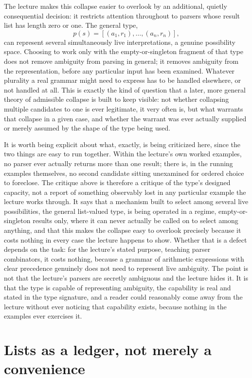 \documentclass[11pt]{article}
\begin{document}
The lecture makes this collapse easier to overlook by an additional, quietly consequential decision: it restricts attention throughout to parsers whose result list has length zero or one. The general type,
\[
p(s) = [(a_1, r_1), \ldots, (a_n, r_n)],
\]
can represent several simultaneously live interpretations, a genuine possibility space. Choosing to work only with the empty-or-singleton fragment of that type does not remove ambiguity from parsing in general; it removes ambiguity from the representation, before any particular input has been examined. Whatever plurality a real grammar might need to express has to be handled elsewhere, or not handled at all. This is exactly the kind of question that a later, more general theory of admissible collapse is built to keep visible: not whether collapsing multiple candidates to one is ever legitimate, it very often is, but what warrants that collapse in a given case, and whether the warrant was ever actually supplied or merely assumed by the shape of the type being used.

It is worth being explicit about what, exactly, is being criticized here, since the two things are easy to run together. Within the lecture's own worked examples, no parser ever actually returns more than one result; there is, in the running examples themselves, no second candidate sitting unexamined for ordered choice to foreclose. The critique above is therefore a critique of the type's designed capacity, not a report of something observably lost in any particular example the lecture works through. It says that a mechanism built to select among several live possibilities, the general list-valued type, is being operated in a regime, empty-or-singleton results only, where it can never actually be called on to select among anything, and that this makes the collapse easy to overlook precisely because it costs nothing in every case the lecture happens to show. Whether that is a defect depends on the task: for the lecture's stated purpose, teaching parser combinators, it costs nothing, because a grammar of arithmetic expressions with clear precedence genuinely does not need to represent live ambiguity. The point is not that the lecture's parsers are secretly ambiguous and the lecture hides it. It is that the type is capable of representing ambiguity, the capability is real and stated in the type signature, and a reader could reasonably come away from the lecture without ever noticing that capability exists, because nothing in the examples ever exercises it.

\section{Lists as a ledger, not merely a convenience}
\end{document}
